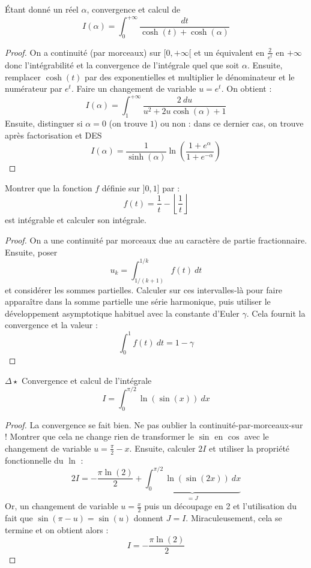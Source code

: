 \documentclass[french,a4paper]{article}
\theoremstyle{plain}
\theoremstyle{definition}
\theoremstyle{remark}
\begin{document}
\begin{ex}[Moulin.IG.28]{}
	Étant donné un réel $\alpha$, convergence et calcul de $$I(\alpha)=\int_{0}^{+\infty}\frac{dt}{\cosh(t)+\cosh(\alpha)}$$
\end{ex}
\begin{proof}
	On a continuité (par morceaux) sur $[0,+\infty[$ et un équivalent en $\displaystyle\frac{2}{e^t}$ en $+\infty$ donc l'intégrabilité et la convergence de l'intégrale quel que soit $\alpha$. Ensuite, remplacer $\cosh(t)$ par des exponentielles et multiplier le dénominateur et le numérateur par $e^t$. Faire un changement de variable $u=e^t$. On obtient : $$I(\alpha)=\int_{1}^{+\infty}\frac{2 \ du}{u^2+2u\cosh(\alpha)+1}$$ Ensuite, distinguer si $\alpha =0$ (on trouve $1$) ou non : dans ce dernier cas, on trouve après factorisation et DES $$I(\alpha)=\frac{1}{\sinh(\alpha)}\ln\left(\frac{1+e^\alpha}{1+e^{-\alpha}}\right)$$
\end{proof}

\begin{ex}[Moulin.IG.29]{}
	Montrer que la fonction $f$ définie sur $]0,1]$ par : $$f(t)=\frac{1}{t}-\left\lfloor\frac{1}{t}\right\rfloor$$ est intégrable et calculer son intégrale.
\end{ex}
\begin{proof}
	On a une continuité par morceaux due au caractère de partie fractionnaire. Ensuite, poser $$u_k=\int_{1/(k+1)}^{1/k}f(t)\ dt$$ et considérer les sommes partielles. Calculer sur ces intervalles-là pour faire apparaître dans la somme partielle une série harmonique, puis utiliser le développement asymptotique habituel avec la constante d'Euler $\gamma$. Cela fournit la convergence et la valeur : $$\int_{0}^{1}f(t)\ dt=1-\gamma$$
\end{proof}

\begin{ex}[Moulin.IG.30]{$\Delta\star$}
	Convergence et calcul de l'intégrale $$I=\int_{0}^{\pi/2}\ln(\sin(x))\ dx$$
\end{ex}
\begin{proof}
	La convergence se fait bien. Ne pas oublier la continuité-par-morceaux-sur ! Montrer que cela ne change rien de transformer le $\sin$ en $\cos$ avec le changement de variable $u=\displaystyle\frac{\pi}{2}-x$. Ensuite, calculer $2I$ et utiliser la propriété fonctionnelle du $\ln$ : $$2I=-\frac{\pi\ln(2)}{2}+\underbrace{\int_{0}^{\pi/2}\ln(\sin(2x))\ dx}_{=J}$$ Or, un changement de variable $u=\displaystyle\frac{x}{2}$ puis un découpage en 2 et l'utilisation du fait que $\sin(\pi-u)=\sin(u)$ donnent $J=I$. Miraculeusement, cela se termine et on obtient alors : $$I=-\frac{\pi\ln(2)}{2}$$ 
\end{proof}
\end{document}
